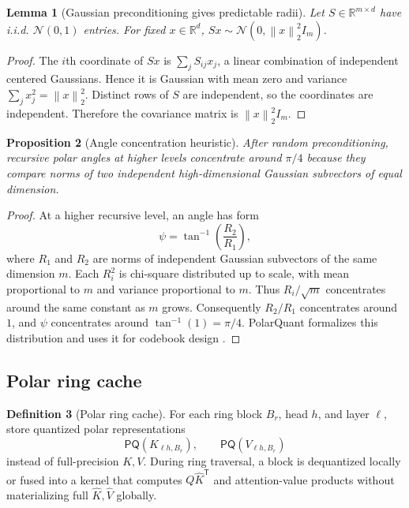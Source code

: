 \documentclass[11pt]{article}
\theoremstyle{definition}
\newtheorem{definition}{Definition}[section]
\theoremstyle{plain}
\newtheorem{lemma}[definition]{Lemma}
\newtheorem{proposition}[definition]{Proposition}
\theoremstyle{remark}
\numberwithin{equation}{section}
\newcommand{\R}{\mathbb{R}}
\newcommand{\norm}[1]{\left\lVert #1\right\rVert}
\newcommand{\transpose}{^{\mathsf T}}
\begin{document}
\begin{lemma}[Gaussian preconditioning gives predictable radii]
Let $S\in\R^{m\times d}$ have i.i.d. $\mathcal N(0,1)$ entries.  For fixed $x\in\R^d$, $Sx\sim\mathcal N(0,\norm{x}_2^2I_m)$.
\end{lemma}

\begin{proof}
The $i$th coordinate of $Sx$ is $\sum_j S_{ij}x_j$, a linear combination of independent centered Gaussians.  Hence it is Gaussian with mean zero and variance $\sum_jx_j^2=\norm{x}_2^2$.  Distinct rows of $S$ are independent, so the coordinates are independent.  Therefore the covariance matrix is $\norm{x}_2^2I_m$.
\end{proof}

\begin{proposition}[Angle concentration heuristic]
After random preconditioning, recursive polar angles at higher levels concentrate around $\pi/4$ because they compare norms of two independent high-dimensional Gaussian subvectors of equal dimension.
\end{proposition}

\begin{proof}
At a higher recursive level, an angle has form
\begin{equation}
  \psi=\tan^{-1}\left(\frac{R_2}{R_1}\right),
\end{equation}
where $R_1$ and $R_2$ are norms of independent Gaussian subvectors of the same dimension $m$.  Each $R_i^2$ is chi-square distributed up to scale, with mean proportional to $m$ and variance proportional to $m$.  Thus $R_i/\sqrt m$ concentrates around the same constant as $m$ grows.  Consequently $R_2/R_1$ concentrates around $1$, and $\psi$ concentrates around $\tan^{-1}(1)=\pi/4$.  PolarQuant formalizes this distribution and uses it for codebook design \cite{han2025polarquant}.
\end{proof}

\subsection{Polar ring cache}

\begin{definition}[Polar ring cache]
For each ring block $B_r$, head $h$, and layer $\ell$, store quantized polar representations
\begin{equation}
  \mathsf{PQ}(K_{\ell h,B_r}),\qquad \mathsf{PQ}(V_{\ell h,B_r})
\end{equation}
instead of full-precision $K,V$.  During ring traversal, a block is dequantized locally or fused into a kernel that computes $Q\widehat K\transpose$ and attention-value products without materializing full $\widehat K,\widehat V$ globally.
\end{definition}
\end{document}
